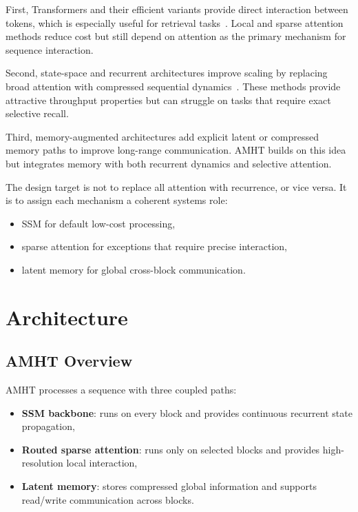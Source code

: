 \documentclass[11pt]{article}
\begin{document}
First, Transformers and their efficient variants provide direct interaction between tokens, which is especially useful for retrieval tasks~\citep{vaswani2017attention,child2019generating,beltagy2020longformer,dao2022flashattention}. Local and sparse attention methods reduce cost but still depend on attention as the primary mechanism for sequence interaction.

Second, state-space and recurrent architectures improve scaling by replacing broad attention with compressed sequential dynamics~\citep{gu2021combining,gu2022s4,dao2024mamba}. These methods provide attractive throughput properties but can struggle on tasks that require exact selective recall.

Third, memory-augmented architectures add explicit latent or compressed memory paths to improve long-range communication. AMHT builds on this idea but integrates memory with both recurrent dynamics and selective attention.

The design target is not to replace all attention with recurrence, or vice versa. It is to assign each mechanism a coherent systems role:
\begin{itemize}
  \item SSM for default low-cost processing,
  \item sparse attention for exceptions that require precise interaction,
  \item latent memory for global cross-block communication.
\end{itemize}

\section{Architecture}

\subsection{AMHT Overview}
AMHT processes a sequence with three coupled paths:
\begin{itemize}
  \item \textbf{SSM backbone}: runs on every block and provides continuous recurrent state propagation,
  \item \textbf{Routed sparse attention}: runs only on selected blocks and provides high-resolution local interaction,
  \item \textbf{Latent memory}: stores compressed global information and supports read/write communication across blocks.
\end{itemize}
\end{document}
